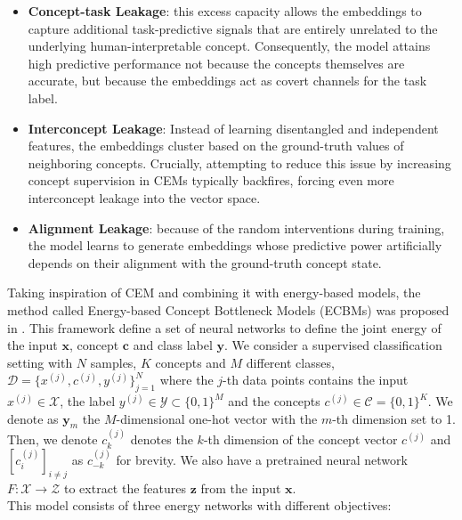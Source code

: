 \begin{itemize}
    \item \textbf{Concept-task Leakage}: this excess capacity allows the embeddings to capture additional task-predictive signals that are entirely unrelated to the underlying human-interpretable concept. Consequently, the model attains high predictive performance not because the concepts themselves are accurate, but because the embeddings act as covert channels for the task label. 
    \item \textbf{Interconcept Leakage}: Instead of learning disentangled and independent features, the embeddings cluster based on the ground-truth values of neighboring concepts. Crucially, attempting to reduce this issue by increasing concept supervision in CEMs typically backfires, forcing even more interconcept leakage into the vector space.
    \item \textbf{Alignment Leakage}: because of the random interventions during training, the model learns to generate embeddings whose predictive power artificially depends on their alignment with the ground-truth concept state.
\end{itemize}
Taking inspiration of CEM and combining it with energy-based models, the method called Energy-based Concept Bottleneck Models (ECBMs) was proposed in \cite{xu2024energybasedconceptbottleneckmodels}. This framework define a set of neural networks to define the joint energy of the input $\mathbf{x}$, concept $\mathbf{c}$ and class label $\mathbf{y}$. We consider a supervised classification setting with $N$ samples, $K$ concepts and $M$ different classes, $\mathcal{D}=\{x^{(j)}, c^{(j)}, y^{(j)}\}_{j=1}^N$ where the $j$-th data points contains the input $x^{(j)}\in\mathcal{X}$, the label $y^{(j)}\in\mathcal{Y}\subset\{0,1\}^M$ and the concepts $c^{(j)}\in\mathcal{C}=\{0,1\}^K$. We denote as $\mathbf{y}_m$ the $M$-dimensional one-hot vector with the $m$-th dimension set to 1. Then, we denote $c_k^{(j)}$ denotes the $k$-th dimension of the concept vector $c^{(j)}$ and $[c_i^{(j)}]_{i\neq j}$ as $c^{(j)}_{-k}$ for brevity. We also have a pretrained neural network $F: \mathcal{X}\rightarrow\mathcal{Z}$ to extract the features $\mathbf{z}$ from the input $\mathbf{x}$. \\ 
This model consists of three energy networks with different objectives: 
